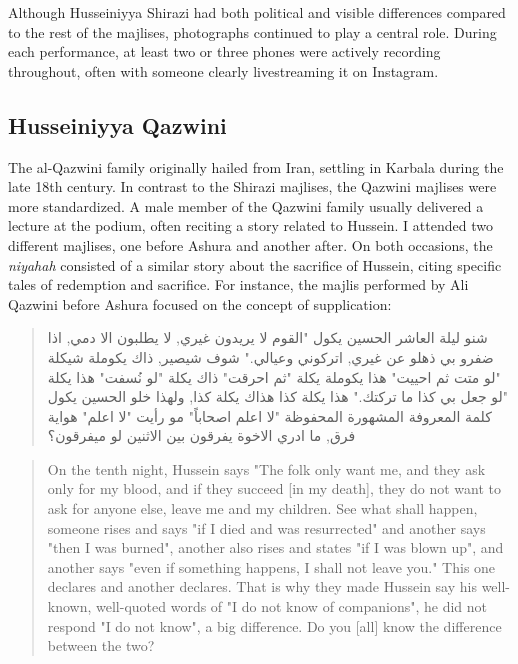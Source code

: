 Although Husseiniyya Shirazi had both political and visible differences compared to the rest of the majlises, photographs continued to play a central role. During each performance, at least two or three phones were actively recording throughout, often with someone clearly livestreaming it on Instagram.

\subsection{Husseiniyya Qazwini}
The al-Qazwini family originally hailed from Iran, settling in Karbala during the late 18th century. In contrast to the Shirazi majlises, the Qazwini majlises were more standardized. A male member of the Qazwini family usually delivered a lecture at the podium, often reciting a story related to Hussein. I attended two different majlises, one before Ashura and another after. On both occasions, the \emph{niyahah} consisted of a similar story about the sacrifice of Hussein, citing specific tales of redemption and sacrifice. For instance, the majlis performed by Ali Qazwini before Ashura focused on the concept of supplication:

\begin{quote}
\begin{Arabic}
شنو ليلة العاشر الحسين يكول "القوم لا يريدون غيري, لا يطلبون الا دمي, اذا ضفرو بي ذهلو عن غيري, اتركوني وعيالي." شوف شيصير, ذاك يكوملة شيكلة "لو متت ثم احييت" هذا يكوملة يكلة "ثم احرقت" ذاك يكلة "لو نُسفت" هذا يكلة "لو جعل بي كذا ما تركتك." هذا يكلة كذا هذاك يكلة كذا, ولهذا خلو الحسين يكول كلمة المعروفة المشهورة المحفوظة "لا اعلم اصحاباً" مو رأيت "لا اعلم" هواية فرق, ما ادري الاخوة يفرقون بين الاثنين لو ميفرقون؟
\end{Arabic}
\end{quote}

\begin{quote}
On the tenth night, Hussein says "The folk only want me, and they ask only for my blood, and if they succeed [in my death], they do not want to ask for anyone else, leave me and my children. See what shall happen, someone rises and says "if I died and was resurrected" and another says "then I was burned", another also rises and states "if I was blown up", and another says "even if something happens, I shall not leave you." This one declares and another declares. That is why they made Hussein say his well-known, well-quoted words of "I do not know of companions", he did not respond "I do not know", a big difference. Do you [all] know the difference between the two?
\end{quote}


